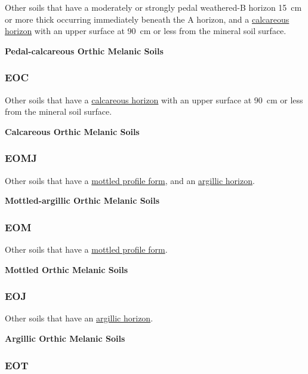 \documentclass[
  letterpaper,
  DIV=11,
  numbers=noendperiod]{scrreprt}
\begin{document}
Other soils that have a moderately or strongly pedal weathered-B horizon
15~cm or more thick occurring immediately beneath the A horizon, and a
\protect\hyperlink{sec-diag-calch}{calcareous horizon} with an upper
surface at 90~cm or less from the mineral soil surface.

\textbf{Pedal-calcareous Orthic Melanic Soils}

\hypertarget{sec-key-EOC}{%
\subsubsection{\texorpdfstring{\textbf{EOC}}{EOC}}\label{sec-key-EOC}}

Other soils that have a \protect\hyperlink{sec-diag-calch}{calcareous
horizon} with an upper surface at 90~cm or less from the mineral soil
surface.

\textbf{Calcareous Orthic Melanic Soils}

\hypertarget{sec-key-EOMJ}{%
\subsubsection{\texorpdfstring{\textbf{EOMJ}}{EOMJ}}\label{sec-key-EOMJ}}

Other soils that have a \protect\hyperlink{sec-diag-mottpf}{mottled
profile form}, and an \protect\hyperlink{sec-diag-argh}{argillic
horizon}.

\textbf{Mottled-argillic Orthic Melanic Soils}

\hypertarget{sec-key-EOM}{%
\subsubsection{\texorpdfstring{\textbf{EOM}}{EOM}}\label{sec-key-EOM}}

Other soils that have a \protect\hyperlink{sec-diag-mottpf}{mottled
profile form}.

\textbf{Mottled Orthic Melanic Soils}

\hypertarget{sec-key-EOJ}{%
\subsubsection{\texorpdfstring{\textbf{EOJ}}{EOJ}}\label{sec-key-EOJ}}

Other soils that have an \protect\hyperlink{sec-diag-argh}{argillic
horizon}.

\textbf{Argillic Orthic Melanic Soils}

\hypertarget{sec-key-EOT}{%
\subsubsection{\texorpdfstring{\textbf{EOT}}{EOT}}\label{sec-key-EOT}}
\end{document}
